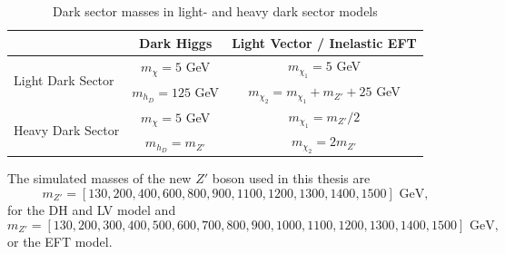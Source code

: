 \documentclass[12pt, a4paper]{book}
\begin{document}
\begin{table}[!h]
    \centering\caption{Dark sector masses in light- and heavy dark sector models}
    \begin{tabular}{l|c|c}\midrule\midrule
                                                                            & Dark Higgs            & Light Vector / Inelastic EFT              \\\midrule
        \multirow{2}{*}[-2\baselineskip]{Light Dark Sector}                 & $m_\chi = 5$ GeV      & $m_{\chi_1}= 5$ GeV                       \\
                                                                            & $m_{h_D} = 125$ GeV   & $m_{\chi_2}= m_{\chi_1}+m_{Z'} + 25$ GeV  \\\midrule
        \multirow{2}{*}[-2\baselineskip]{Heavy Dark Sector}                 & $m_\chi = 5$ GeV      & $m_{\chi_1}= m_{Z'}/2$                    \\
                                                                            & $m_{h_D} = m_{Z'}$    & $m_{\chi_2}= 2m_{Z'}$                     \\\midrule\midrule
    \end{tabular}
    \label{tab:DMass}
\end{table}
\newpage\noindent The simulated masses of the new $Z'$ boson used in this thesis are
$$
m_{Z'} = [130, 200, 400, 600, 800, 900, 1100, 1200, 1300, 1400, 1500]\text{ GeV},
$$
for the DH and LV model and 
$$
m_{Z'} = [130, 200, 300, 400, 500, 600, 700, 800, 900, 1000, 1100, 1200, 1300, 1400, 1500]\text{ GeV},
$$
or the EFT model.
\end{document}
